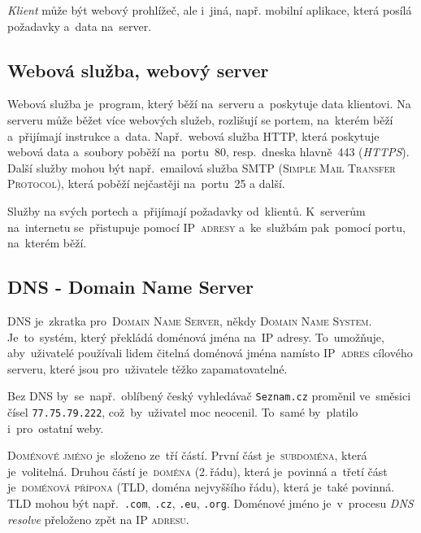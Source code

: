 \documentclass[14pt,a4paper]{article}
\begin{document}
        \emph{Klient} může být webový prohlížeč, ale i~jiná, např. mobilní aplikace, která posílá požadavky a~data na~server.

        \subsection{Webová služba, webový server}
        Webová služba je~program, který běží na~serveru a~poskytuje data klientovi. Na serveru může běžet více webových služeb, rozlišují se portem, na~kterém běží a~přijímají instrukce a~data. Např.~webová služba HTTP, která poskytuje webová data a~soubory poběží na~portu~80, resp.~dneska hlavně~443 (\emph{HTTPS}). Další služby mohou být např.~emailová služba SMTP (\textsc{Simple Mail Transfer Protocol}), která poběží nejčastěji na~portu~25 a další.
        
        Služby  na svých portech a~přijímají požadavky od~klientů. K~serverům na~internetu se~přistupuje pomocí \textsc{IP~adresy} a~ke~službám pak~pomocí portu, na~kterém běží. \cite{webserver:mdn}

        \subsection{DNS - Domain Name Server}
        \textsc{DNS} je~zkratka pro~\textsc{Domain Name Server}, někdy \textsc{Domain Name System}. Je~to~systém, který překládá doménová jména na~IP adresy. To~umožňuje, aby~uživatelé používali lidem čitelná doménová jména namísto \textsc{IP~adres} cílového serveru, které jsou pro~uživatele těžko zapamatovatelné.
        
        Bez \textsc{DNS} by~se~např.~oblíbený český vyhledávač \texttt{Seznam.cz} proměnil ve~směsici čísel \texttt{77.75.79.222}, což~by~uživatel moc neocenil. To~samé by~platilo i~pro~ostatní weby.

        \textsc{Doménové jméno} je~složeno ze~tří částí. První část je~\textsc{subdoména}, která je~volitelná. Druhou částí je~\textsc{doména} (2.\,řádu), která je~povinná a~třetí část je~\textsc{doménová přípona} (TLD, doména nejvyššího řádu), která je~také povinná. TLD mohou být např.~\texttt{.com}, \texttt{.cz}, \texttt{.eu}, \texttt{.org}. Doménové jméno je~v~procesu \emph{DNS resolve} přeloženo zpět na \textsc{IP adresu}. \cite{tld:mdn}
        
\end{document}
